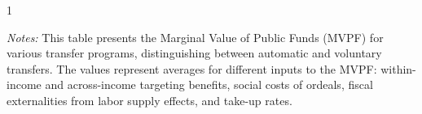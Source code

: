 \begin{table}[H]
\begin{tabular*}{1.36\textwidth}{@{\extracolsep{\fill}}lcccccccccc@{}}
  \end{tabular*}
  \begin{spacing}{1}
      \begin{tablenotes}
            \item \footnotesize \textit{Notes:} This table presents the Marginal Value of Public Funds (MVPF) for various transfer programs, distinguishing between automatic and voluntary transfers. The values represent averages for different inputs to the MVPF: within-income and across-income targeting benefits, social costs of ordeals, fiscal externalities from labor supply effects, and take-up rates. 
            \end{tablenotes}
             \end{spacing}
            \end{table}
